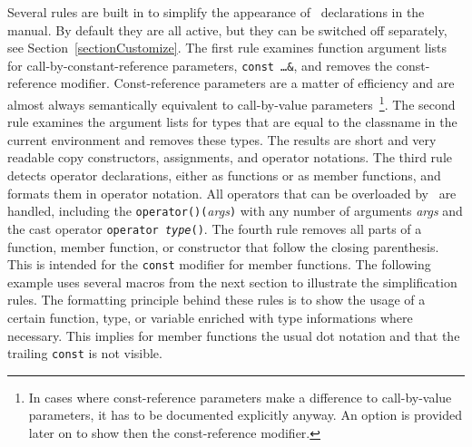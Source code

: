 \documentclass[11pt]{article}
\begin{document}
  
   
 
  
Several rules are built in to simplify the appearance of \CC\ 
declarations in the manual. By default they are all active, but they
can be switched off separately, see Section~\ref{sectionCustomize}.
The first rule examines function argument lists for
call-by-constant-reference parameters, {\tt const \ldots \&}, and
removes the const-reference modifier. Const-reference parameters are a
matter of efficiency and are almost always semantically equivalent to
call-by-value parameters~\footnote{In cases where const-reference
  parameters make a difference to call-by-value parameters, it has to
  be documented explicitly anyway. An option is provided later on to
  show then the const-reference modifier.}. The second rule examines
the argument lists for types that are equal to the classname in the
current environment and removes these types. The results are short and
very readable copy constructors, assignments, and operator notations.
The third rule detects operator declarations, either as functions or
as member functions, and formats them in operator notation. All
operators that can be overloaded by \CC\ are handled, including the
{\tt operator()(}{\em args\/}{\tt )} with any number of arguments {\em
  args} and the cast operator {\tt operator {\em type\/}()}.  The
fourth rule removes all parts of a function, member function, or
constructor that follow the closing parenthesis. This is intended for
the {\tt const} modifier for member functions. The following example
uses several macros from the next section to illustrate the
simplification rules. The formatting principle behind these rules is
to show the usage of a certain function, type, or variable enriched
with type informations where necessary. This implies for member
functions the usual dot notation and that the trailing {\tt const} is
not visible.
\end{document}
